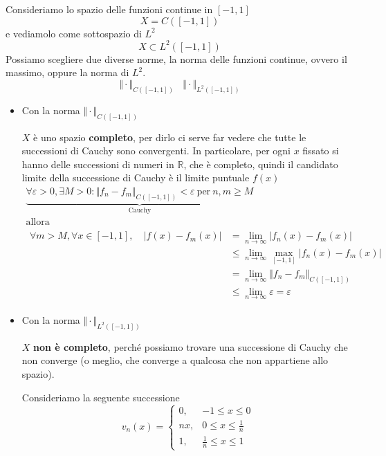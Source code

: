 \documentclass[10pt,a4paper,twoside,openright]{book}
\begin{document}
Consideriamo lo spazio delle funzioni continue in $\displaystyle [ -1,1]$
\begin{equation*}
	X=C([ -1,1])
\end{equation*}
e vediamolo come sottospazio di $\displaystyle L^{2}$
\begin{equation*}
	X\subset L^{2}([ -1,1])
\end{equation*}
Possiamo scegliere due diverse norme, la norma delle funzioni continue, ovvero il massimo, oppure la norma di $\displaystyle L^{2}$.
\begin{equation*}
	\Vert \cdotp \Vert _{C([ -1,1])} \ \ \ \ \Vert \cdotp \Vert _{L^{2}([ -1,1])}
\end{equation*}
\begin{itemize}
\item Con la norma $\displaystyle \Vert \cdotp \Vert _{C([ -1,1])}$

$X$ è uno spazio \textbf{completo}, per dirlo ci serve far vedere che tutte le successioni di Cauchy sono convergenti. In particolare, per ogni $x$ fissato si hanno delle successioni di numeri in $\displaystyle \mathbb{R}$, che è completo, quindi il candidato limite della successione di Cauchy è il limite puntuale $\displaystyle f(x)$
\begin{gather*}
	\underbrace{\forall \varepsilon  >0,\exists M >0:\Vert f_{n} -f_{m}\Vert _{C([ -1,1])} < \varepsilon \ \text{per} \ n,m\geqslant M}_{\text{Cauchy}}\\
	\text{allora}\\
	\begin{aligned}
		\forall m >M,\forall x\in [ -1,1],\quad |f(x) -f_{m}(x) | & =\lim _{n\rightarrow \infty } |f_{n}(x) -f_{m}(x) |\\
			 & \leqslant \lim _{n\rightarrow \infty }\max_{[ -1,1]} |f_{n}(x) -f_{m}(x) |\\
			 & =\lim _{n\rightarrow \infty }\Vert f_{n} -f_{m}\Vert _{C([ -1,1])}\\
			 & \leqslant \lim _{n\rightarrow \infty } \varepsilon =\varepsilon 
	\end{aligned}
\end{gather*}
\item Con la norma $\displaystyle \Vert \cdotp \Vert _{L^{2}([ -1,1])}$

$X$ \textbf{non è completo}, perché possiamo trovare una successione di Cauchy che non converge (o meglio, che converge a qualcosa che non appartiene allo spazio).

Consideriamo la seguente successione
\begin{equation*}
v_{n}(x) =
\begin{cases}
0, & -1\leqslant x\leqslant 0\\
nx, & 0\leqslant x\leqslant \frac{1}{n}\\
1, & \frac{1}{n} \leqslant x\leqslant 1
\end{cases}
\end{equation*}




\end{itemize}
\end{document}
